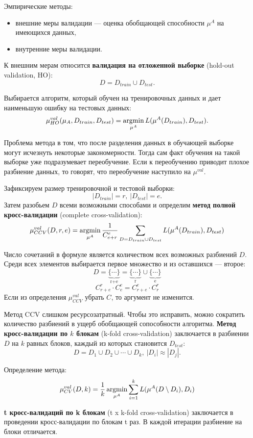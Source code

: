 Эмпирические методы:
\begin{itemize}
    \item внешние меры валидации --- оценка обобщающей способности $\mu^A$ на
        имеющихся данных,
    \item внутренние меры валидации.
\end{itemize}

К внешним мерам относится \textbf{валидация на отложенной выборке} (hold-out
validation, HO):
\[
D = D_{train} \cup D_{test}.
\]

Выбирается алгоритм, который обучен на тренировочных данных и дает наименьшую
ошибку на тестовых данных:
\[
    \mu_{HO}^{val}(\mu_A, D_{train}, D_{test}) = 
    \operatorname*{argmin}_{\mu^A} L(\mu^A(D_{train}), D_{test}).
\]

Проблема метода в том, что после разделения данных в обучающей выборке могут
исчезнуть некоторые закономерности. Тогда сам факт обучения на такой выборке
уже подразумевает переобучение. Если к переобучению приводит плохое разбиение
данных, то говорят, что переобучение наступило на $\mu^{val}$.

Зафиксируем размер тренировочной и тестовой выборки:
\[
|D_{train}| = r,\ |D_{test}| = e.
\]
Затем разобьем $D$ всеми возможными способами и определим \textbf{метод полной
кросс-валидации} (complete cross-validation):
\[
    \mu_{CCV}^{val}(D, r, e) = \operatorname*{argmin}_{\mu^A} \frac{1}{C^e_{e+r}}
    \sum_{D = D_{train} \cup D_{test}} L(\mu^A(D_{train}), D_{test})
\]

Число сочетаний в формуле является количеством всех возможных разбиений $D$.
Среди всех элементов выбирается первое множество и из оставшихся --- второе:
\[
    D = \underbrace{\{ \cdots \}}_\text{r+e} =
    \underbrace{\{ \cdots \}}_\text{r} \cup 
    \underbrace{\{ \cdots \}}_\text{e}
\]
\[
    C^r_{r+e} \cdot C^e_e = C^e_{r+e} \cdot C^r_r
\]
Если из определения $\mu_{CCV}^{val}$ убрать $C$, то аргумент не изменится.

Метод CCV слишком ресурсозатратный. Чтобы это исправить, можно сократить
количество разбиений в ущерб обобщающей сопособности алгоритма. \textbf{Метод
кросс-валидации по $k$ блокам} (k-fold cross-validation) заключается в
разбиении $D$ на $k$ равных блоков, каждый из которых становится $D_{test}$:
\[
D = D_1 \cup D_2 \cup \cdots \cup D_k,\ |D_i| \approx |D_j|.
\]

Определение метода:
\[
    \mu^{val}_{CV}(D, k) = \frac{1}{k} \operatorname*{argmin}_{\mu^A} \sum^k_{i =1} 
    L(\mu^{A}(D \setminus D_i), D_i)
\]

\textbf{t кросс-валидаций по k блокам} (t x k-fold cross-validation) заключается
в проведении кросс-валидации по блокам t раз. В каждой итерации разбиение
на блоки отличается.

